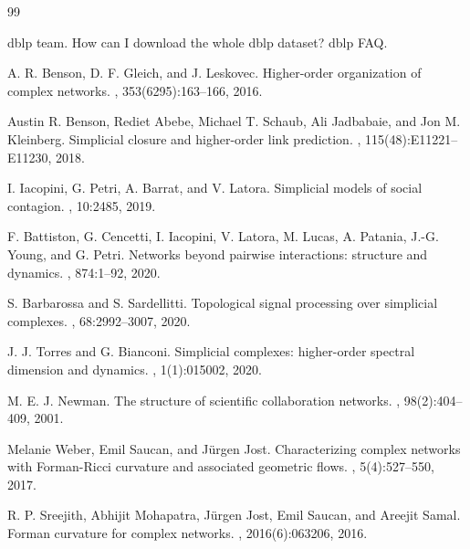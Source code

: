 \documentclass[11pt]{article}
\begin{document}
\begin{thebibliography}{99}

dblp team.
\newblock How can I download the whole dblp dataset?
\newblock dblp FAQ.

A. R. Benson, D. F. Gleich, and J. Leskovec.
\newblock Higher-order organization of complex networks.
, 353(6295):163--166, 2016.

Austin R. Benson, Rediet Abebe, Michael T. Schaub, Ali Jadbabaie, and Jon M. Kleinberg.
\newblock Simplicial closure and higher-order link prediction.
, 115(48):E11221--E11230, 2018.

I. Iacopini, G. Petri, A. Barrat, and V. Latora.
\newblock Simplicial models of social contagion.
, 10:2485, 2019.

F. Battiston, G. Cencetti, I. Iacopini, V. Latora, M. Lucas, A. Patania, J.-G. Young, and G. Petri.
\newblock Networks beyond pairwise interactions: structure and dynamics.
, 874:1--92, 2020.

S. Barbarossa and S. Sardellitti.
\newblock Topological signal processing over simplicial complexes.
, 68:2992--3007, 2020.

J. J. Torres and G. Bianconi.
\newblock Simplicial complexes: higher-order spectral dimension and dynamics.
, 1(1):015002, 2020.

M. E. J. Newman.
\newblock The structure of scientific collaboration networks.
, 98(2):404--409, 2001.

Melanie Weber, Emil Saucan, and J\"urgen Jost.
\newblock Characterizing complex networks with Forman-Ricci curvature and associated geometric flows.
, 5(4):527--550, 2017.

R. P. Sreejith, Abhijit Mohapatra, J\"urgen Jost, Emil Saucan, and Areejit Samal.
\newblock Forman curvature for complex networks.
, 2016(6):063206, 2016.


\end{thebibliography}
\end{document}
